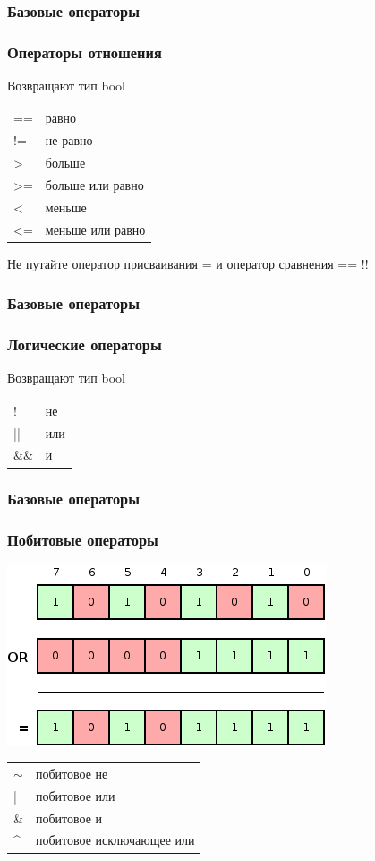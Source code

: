 \documentclass[12pt,pdf,hyperref={unicode}]{beamer}
\begin{document}
\iffalse

\begin{frame}
\frametitle{Базовые операторы}
\frametitle{Операторы отношения}
Возвращают тип bool
\begin{center}
\begin{tabular}{ l l}
  == & равно \\
  != & не равно \\
  > & больше \\
  >= & больше или равно \\
  < & меньше \\
  <= & меньше или равно \\
\end{tabular}
\end{center}

Не путайте оператор присваивания = и оператор сравнения == !! 
\end{frame}


\begin{frame}
\frametitle{Базовые операторы}
\frametitle{Логические операторы}
Возвращают тип bool
\begin{center}
\begin{tabular}{ l l}
  ! & не \\
  || & или \\
  \&\& & и \\
\end{tabular}
\end{center}
\end{frame}

\begin{frame}
\frametitle{Базовые операторы}
\frametitle{Побитовые операторы}
\begin{center}
\includegraphics[scale=0.5]{bitwise_or.png}
\end{center}
\begin{center}
\begin{tabular}{ l l}
  $\sim$ & побитовое не \\
  | & побитовое или \\
  \& & побитовое и \\
  \^{} & побитовое исключающее или \\
\end{tabular}
\end{center}
\end{frame}
\end{document}
